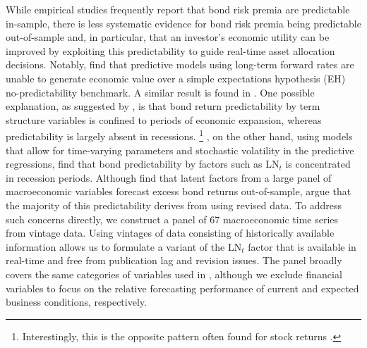 \documentclass[12pt,letterpaper,leqno,doublespacing]{article}
\begin{document}
While empirical studies frequently report that bond risk premia are predictable in-sample, there is less systematic evidence for bond risk premia being predictable out-of-sample and, in particular, that an investor's economic utility can be improved by exploiting this predictability to guide real-time asset allocation decisions. Notably, \cite{ThorntonValente2012} find that predictive models using long-term forward rates are unable to generate economic value over a simple expectations hypothesis (EH) no-predictability benchmark. A similar result is found in \cite{SarnoSchneiderWagner2014}. One possible explanation, as suggested by \cite{AndreasenEngstedMoellerSander2014}, is that bond return predictability by term structure variables is confined to periods of economic expansion, whereas predictability is largely absent in recessions.%
\footnote{Interestingly, this is the opposite pattern often found for stock returns \citep{HenkelMartinNardari2011,DanglHalling2012,RapachZhou2013,MoellerSander2014}.}
% 
\cite{GarganoPettenuzzoTimmermann2014}, on the other hand, using models that allow for time-varying parameters and stochastic volatility in the predictive regressions, find that bond predictability by factors such as LN$_{t}$ is concentrated in recession periods. Although \cite{LudvigsonNg2009} find that latent factors from a large panel of macroeconomic variables forecast excess bond returns out-of-sample, \cite{GhyselsHoranMoench2014} argue that the majority of this predictability derives from using revised data. To address such concerns directly, we construct a panel of $67$ macroeconomic time series from vintage data. Using vintages of data consisting of historically available information allows us to formulate a variant of the LN$_{t}$ factor that is available in real-time and free from publication lag and revision issues. The panel broadly covers the same categories of variables used in \cite{LudvigsonNg2009}, although we exclude financial variables to focus on the relative forecasting performance of current and expected business conditions, respectively.
\end{document}
